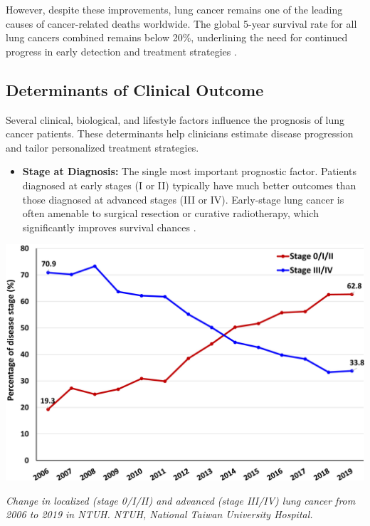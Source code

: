 However, despite these improvements, lung cancer remains one of the leading causes of cancer-related 
deaths worldwide. The global 5-year survival rate for all lung cancers combined remains below 20\%, 
underlining the need for continued progress in early detection and treatment strategies 
\cite{bray2018global}.

\subsection{Determinants of Clinical Outcome}

Several clinical, biological, and lifestyle factors influence the prognosis of lung cancer patients. 
These determinants help clinicians estimate disease progression and tailor personalized treatment 
strategies.

\begin{itemize}
    \item \textbf{Stage at Diagnosis:} The single most important prognostic factor. Patients 
    diagnosed at early stages (I or II) typically have much better outcomes than those diagnosed at 
    advanced stages (III or IV). Early-stage lung cancer is often amenable to surgical resection or 
    curative radiotherapy, which significantly improves survival chances \cite{goldstaging}.
\end{itemize}

\vspace{1em}
\begin{center}
    \includegraphics[width=1.00\textwidth]{../assets/05-prognosis/stage-survival-rates.jpg}

    \small\textit{Change in localized (stage 0/I/II) and advanced (stage III/IV) lung cancer from 
    2006 to 2019 in NTUH. NTUH, National Taiwan University Hospital. \cite{osarogiagbon2023stage}}
\end{center}
\vspace{1em}

